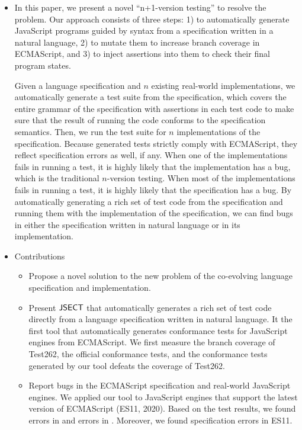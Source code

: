\begin{itemize}
\item In this paper, we present a novel ``n+1-version testing'' to
resolve the problem. Our approach consists of three
steps: 1) to automatically generate JavaScript programs guided by
syntax from a specification written in a natural language, 2)
to mutate them to increase branch coverage in ECMAScript, and 3) to inject
assertions into them to check their final program states.

Given a language specification and $n$ existing
real-world implementations, we automatically generate a test suite from
the specification, which covers the entire grammar of the
specification with assertions in each test code to make sure that the
result of running the code conforms to the specification semantics.
Then, we run the test suite for $n$ implementations of the
specification. Because generated tests strictly comply with ECMAScript,
they reflect specification errors as well, if any.
 When one of the implementations fails in running a test,
it is highly likely that the implementation has a bug, which is the
traditional $n$-version testing. When most of the implementations fails
in running a test, it is highly likely that the specification has a
bug. By automatically generating a rich set of test code from the
specification and running them with the implementation of the
specification, we can find bugs in either the specification written in
natural language or in its implementation.

\item Contributions
\begin{itemize}
\item Propose a novel solution to the new problem of the co-evolving
  language specification and implementation.
\item Present $\text{\sf JSECT}$ that automatically generates a rich set of test
code directly from a language specification written in natural language.
It the first tool that automatically
generates conformance tests for JavaScript engines from ECMAScript.
We first measure the branch coverage of Test262, the official
        conformance tests, and the conformance tests generated by our tool
        defeats the coverage of Test262.
\item Report bugs in the ECMAScript specification and real-world
JavaScript engines.
We applied our tool to  JavaScript engines that support the
        latest version of ECMAScript (ES11, 2020).  Based on the test results,
        we found  errors in  and  errors in
        . Moreover, we found  specification errors in
        ES11.
\end{itemize}


\end{itemize}
